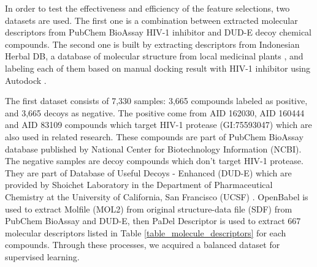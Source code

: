 \documentclass[conference,compsoc,12pt]{IEEEtran}
\begin{document}
	In order to test the effectiveness and efficiency of the feature selections, two datasets are used. The first one is a combination between extracted molecular descriptors from PubChem BioAssay HIV-1 inhibitor \cite{bioassay2014update} and DUD-E decoy chemical compounds\cite{mysinger2012directory}. The second one is built by extracting descriptors from Indonesian Herbal DB, a database of molecular structure from local medicinal plants \cite{yanuar2011medicinal}, and labeling each of them based on manual docking result with HIV-1 inhibitor using Autodock \cite{morris2009autodock4}.  
	
	The first dataset consists of 7,330 samples: 3,665 compounds labeled as positive, and 3,665 decoys as negative. The positive come from AID 162030, AID 160444 and AID 83109 compounds which target HIV-1 protease (GI:75593047) which are also used in related research\cite{yanuar2014virtual}. These compounds are part of PubChem BioAssay database published by National Center for Biotechnology Information (NCBI). The negative samples are decoy compounds which don't target HIV-1 protease. They are part of Database of Useful Decoys - Enhanced (DUD-E) which are provided by Shoichet Laboratory in the Department of Pharmaceutical Chemistry at the University of California, San Francisco (UCSF) \cite{mysinger2012directory}. OpenBabel\cite{o2011open} is used to extract Molfile (MOL2) from original structure-data file (SDF) from PubChem BioAssay and DUD-E, then PaDel Descriptor\cite{yap2011padel} is used to extract 667 molecular descriptors listed in Table \ref{table_molecule_descriptors} for each compounds. Through these processes, we acquired a balanced dataset for supervised learning.
	
\end{document}
